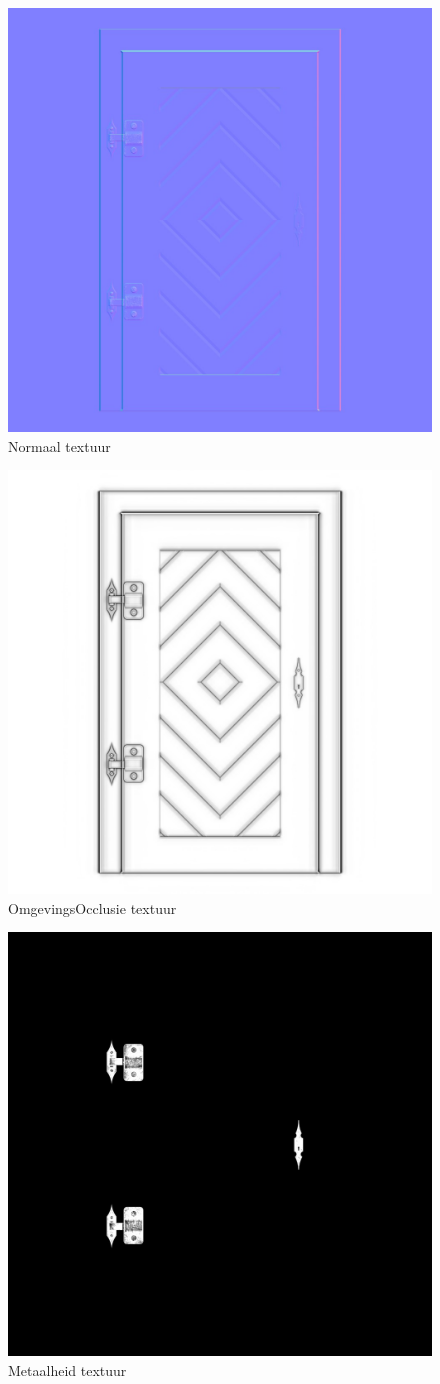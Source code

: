 \begin{figure}
	\centering
	\includegraphics[width=.5\linewidth]{graphics/normalTexture}
	\caption[Normaal textuur]{Normaal textuur}
	\label{fig:normalTexture}
\end{figure}
\begin{figure}
	\centering
	\includegraphics[width=.5\linewidth]{graphics/ambientOcclusionTexture}
	\caption[OmgevingsOcclusie textuur]{OmgevingsOcclusie textuur}
	\label{fig:ambientOcclusionTexture}
\end{figure}
\begin{figure}
	\centering
	\includegraphics[width=.5\linewidth]{graphics/metalnessTexture}
	\caption[Metaalheid textuur]{Metaalheid textuur}
	\label{fig:metalnessTexture}
\end{figure}
